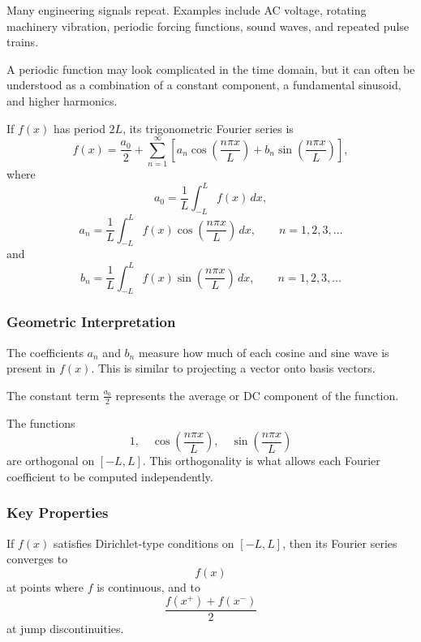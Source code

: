 Many engineering signals repeat. Examples include AC voltage, rotating machinery vibration, periodic forcing functions, sound waves, and repeated pulse trains.

A periodic function may look complicated in the time domain, but it can often be understood as a combination of a constant component, a fundamental sinusoid, and higher harmonics.

\begin{conceptbox}
    If $f(x)$ has period $2L$, its trigonometric Fourier series is
    \[
        f(x)=\frac{a_0}{2}+\sum_{n=1}^{\infty}
        \left[
            a_n\cos\left(\frac{n\pi x}{L}\right)
            +b_n\sin\left(\frac{n\pi x}{L}\right)
            \right],
    \]
    where
    \[
        a_0=\frac{1}{L}\int_{-L}^{L} f(x)\,dx,
    \]
    \[
        a_n=\frac{1}{L}\int_{-L}^{L}
        f(x)\cos\left(\frac{n\pi x}{L}\right)\,dx,
        \qquad n=1,2,3,\ldots
    \]
    and
    \[
        b_n=\frac{1}{L}\int_{-L}^{L}
        f(x)\sin\left(\frac{n\pi x}{L}\right)\,dx,
        \qquad n=1,2,3,\ldots
    \]
\end{conceptbox}

\subsubsection*{Geometric Interpretation}

The coefficients $a_n$ and $b_n$ measure how much of each cosine and sine wave is present in $f(x)$. This is similar to projecting a vector onto basis vectors.

The constant term $\frac{a_0}{2}$ represents the average or DC component of the function.

\begin{conceptbox}
    The functions
    \[
        1,\quad \cos\left(\frac{n\pi x}{L}\right),\quad
        \sin\left(\frac{n\pi x}{L}\right)
    \]
    are orthogonal on $[-L,L]$. This orthogonality is what allows each Fourier coefficient to be computed independently.
\end{conceptbox}

\subsubsection*{Key Properties}

If $f(x)$ satisfies Dirichlet-type conditions on $[-L,L]$, then its Fourier series converges to
\[
    f(x)
\]
at points where $f$ is continuous, and to
\[
    \frac{f(x^+)+f(x^-)}{2}
\]
at jump discontinuities.

